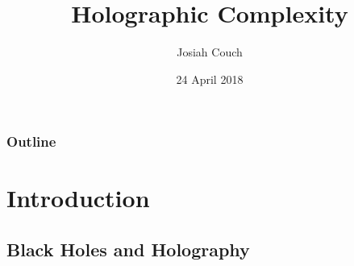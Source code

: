 \documentclass[8pt,aspectratio=169]{beamer}
\title{Holographic Complexity}
\author{Josiah Couch}
\institute{University of Texas at Austin}
\date{24 April 2018}
\begin{document}
\begin{frame}
\titlepage\end{frame}

\begin{frame}
\frametitle{Outline}
\tableofcontents[]
\end{frame}

\section{Introduction}

\subsection{Black Holes and Holography}










\end{document}
